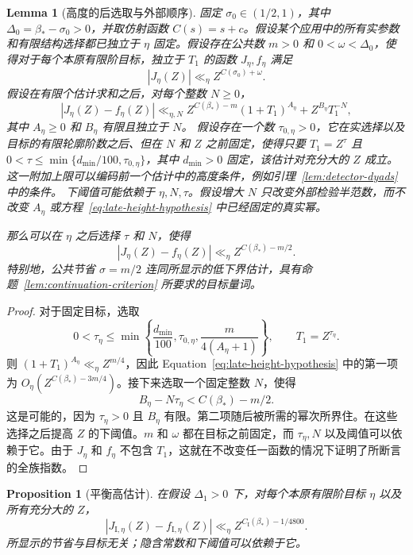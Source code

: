 \documentclass[11pt,a4paper]{article}
\numberwithin{equation}{section}
\numberwithin{figure}{section}
\newtheorem{proposition}[theorem]{Proposition}
\newtheorem{lemma}[theorem]{Lemma}
\theoremstyle{definition}
\theoremstyle{remark}
\begin{document}
\begin{lemma}[高度的后选取与外部顺序]
\label{lem:late-height-closure}
固定 $\sigma_0\in(1/2,1)$，其中 $\Delta_0=\beta_*-\sigma_0>0$，并取仿射函数 $C(s)=s+c$。假设某个应用中的所有实参数和有限结构选择都已独立于 $\eta$ 固定。假设存在公共数 $m>0$ 和
$0<\omega<\Delta_0$，使得对于每个本原有限阶目标，独立于 $T_1$ 的函数 $J_\eta,f_\eta$ 满足
\[
 |J_\eta(Z)|\ll_\eta Z^{C(\sigma_0)+\omega}.
\]
假设在有限个估计求和之后，对每个整数 $N\ge0$，
\begin{equation}
 |J_\eta(Z)-f_\eta(Z)|
 \ll_{\eta,N} Z^{C(\beta_*)-m}(1+T_1)^{A_\eta}
       +Z^{B_\eta}T_1^{-N},
 \label{eq:late-height-hypothesis}
\end{equation}
其中 $A_\eta\ge0$ 和 $B_\eta$ 有限且独立于 $N$。
假设存在一个数 $\tau_{0,\eta}>0$，它在实选择以及目标的有限轮廓阶数之后、但在 $N$ 和 $Z$ 之前固定，使得只要
$T_1=Z^\tau$ 且
$0<\tau\le\min\{d_{\min}/100,\tau_{0,\eta}\}$，其中 $d_{\min}>0$ 固定，该估计对充分大的 $Z$ 成立。
这一附加上限可以编码前一个估计中的高度条件，例如引理~\ref{lem:detector-dyads} 中的条件。
下阈值可能依赖于 $\eta,N,\tau$。假设增大 $N$ 只改变外部检验半范数，而不改变 $A_\eta$ 或方程~\eqref{eq:late-height-hypothesis} 中已经固定的真实幂。

那么可以在 $\eta$ 之后选择 $\tau$ 和 $N$，使得
\[
 |J_\eta(Z)-f_\eta(Z)|\ll_\eta Z^{C(\beta_*)-m/2}.
\]
特别地，公共节省 $\sigma=m/2$ 连同所显示的低下界估计，具有命题~\ref{lem:continuation-criterion} 所要求的目标量词。
\end{lemma}\begin{proof}
对于固定目标，选取
\[
0<\tau_\eta\le
 \min\left\{\frac{d_{\min}}{100},\tau_{0,\eta},
                 \frac{m}{4(A_\eta+1)}\right\},
 \qquad T_1=Z^{\tau_\eta}.
\]
则 $(1+T_1)^{A_\eta}\ll_\eta Z^{m/4}$，因此
Equation~\eqref{eq:late-height-hypothesis} 中的第一项为
$O_\eta(Z^{C(\beta_*)-3m/4})$。接下来选取一个固定整数 $N$，使得
\[
 B_\eta-N\tau_\eta<C(\beta_*)-m/2.
\]
这是可能的，因为 $\tau_\eta>0$ 且 $B_\eta$ 有限。第二项随后被所需的幂次所界住。在这些选择之后提高 $Z$ 的下阈值。$m$ 和 $\omega$ 都在目标之前固定，而 $\tau_\eta,N$ 以及阈值可以依赖于它。由于 $J_\eta$ 和 $f_\eta$ 不包含 $T_1$，这就在不改变任一函数的情况下证明了所断言的全族指数。
\end{proof}

\begin{proposition}[平衡高估计]
\label{prop:balanced-high}
在假设 $\Delta_1>0$ 下，对每个本原有限阶目标
$\eta$ 以及所有充分大的 $Z$，
\[
 |J_{\mathrm I,\eta}(Z)-f_{\mathrm I,\eta}(Z)|
 \ll_\eta Z^{C_{\mathrm I}(\beta_*)-1/4800}.
\]
所显示的节省与目标无关；隐含常数和下阈值可以依赖于它。
\end{proposition}
\end{document}
